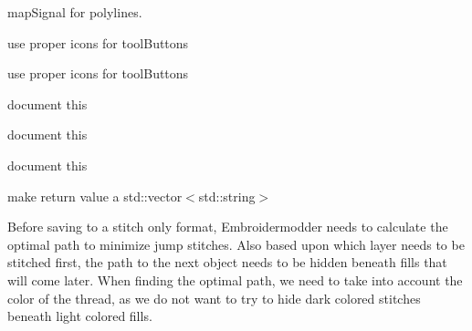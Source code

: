 \begin{DoxyRefList}
map\+Signal for polylines.  
\item[Member \mbox{\hyperlink{class_property_editor_a381655979bcdfa36390cbeccd04ad5a9}{Property\+Editor\+::create\+Group\+Box\+Misc\+Text\+Single}} ()]\label{todo__todo000049}%
%
use proper icons for tool\+Buttons  
\item[Member \mbox{\hyperlink{class_property_editor_ac1a474e724e31d836f3d3679dd81d217}{Property\+Editor\+::create\+Group\+Box\+Text\+Text\+Single}} ()]\label{todo__todo000047}%
%
use proper icons for tool\+Buttons  
\item[Member \mbox{\hyperlink{class_property_editor_a25880d96f0b4466fc4342255adaa7022}{Property\+Editor\+::create\+Tool\+Button\+QSelect}} ()]\label{todo__todo000019}%
%
document this  
\item[Member \mbox{\hyperlink{class_property_editor_ad7452c5931d2f0c7f63a308d1ccccfc7}{Property\+Editor\+::event\+Filter}} (QObject $\ast$obj, QEvent $\ast$event)]\label{todo__todo000017}%
%
document this  
\item[Member \mbox{\hyperlink{class_property_editor_a4bca2abc45a97402b7135f7b8407d125}{Property\+Editor\+::$\sim$\+Property\+Editor}} ()]\label{todo__todo000016}%
%
document this  
\item[Member \mbox{\hyperlink{class_rect_object_acfde9da59c0bbaaab7decdc222aa38a3}{Rect\+Object\+::all\+Grip\+Points}} ()]\label{todo__todo000013}%
%
make return value a std\+::vector$<$std\+::string$>$  
\item[Member \mbox{\hyperlink{class_save_object_a15bdf578a20c1c1cb630dc8264448484}{Save\+Object\+::save}} (const QString \&file\+Name)]\label{todo__todo000014}%
%
Before saving to a stitch only format, Embroidermodder needs to calculate the optimal path to minimize jump stitches. Also based upon which layer needs to be stitched first, the path to the next object needs to be hidden beneath fills that will come later. When finding the optimal path, we need to take into account the color of the thread, as we do not want to try to hide dark colored stitches beneath light colored fills.  
\item[Member \mbox{\hyperlink{class_save_object_aaa28ee2579ab1b54602812d652889737}{Save\+Object\+::to\+Polyline}} (Emb\+Pattern $\ast$pattern, const QPointF \&obj\+Pos, const QPainter\+Path \&obj\+Path, const QString \&layer, const QColor \&color, const QString \&line\+Type, const QString \&line\+Weight)]\label{todo__todo000015}%

\end{DoxyRefList}

